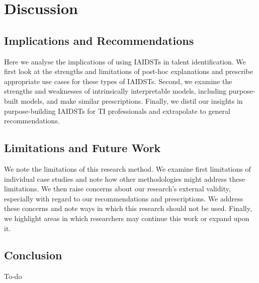 

\chapter{\label{ch:6-discussion}Discussion}

\minitoc

\section{Implications and Recommendations}
Here we analyse the implications of using IAIDSTs in talent identification. We first look at the strengths and limitations of post-hoc explanations and prescribe appropriate use cases for these types of IAIDSTs. Second, we examine the strengths and weaknesses of intrinsically interpretable models, including purpose-built models, and make similar prescriptions. Finally, we distil our insights in purpose-building IAIDSTs for TI professionals and extrapolate to general recommendations.

\section{Limitations and Future Work}
We note the limitations of this research method. We examine first limitations of individual case studies and note how other methodologies might address these limitations. We then raise concerns about our research's external validity, especially with regard to our recommendations and prescriptions. We address these concerns and note ways in which this research should not be used. Finally, we highlight areas in which researchers may continue this work or expand upon it.

\section{Conclusion}
To-do